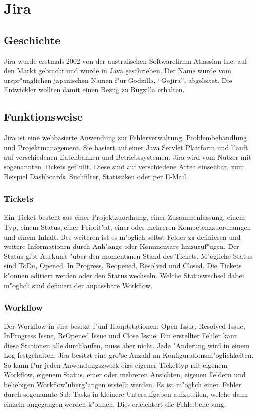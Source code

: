 \section{Jira}
\subsection{Geschichte}
Jira wurde erstmals 2002 von der australischen Softwarefirma Atlassian Inc. auf den Markt gebracht und wurde in Java geschrieben. Der Name wurde vom urspr"unglichen japanischen Namen f"ur Godzilla, ``Gojira'', abgeleitet. Die Entwickler wollten damit einen Bezug zu Bugzilla erhalten.

\subsection{Funktionsweise}
Jira ist eine webbasierte Anwendung zur Fehlerverwaltung, Problembehandlung und Projektmanagement. Sie basiert auf einer Java Servlet Plattform und l"auft auf verschiedenen Datenbanken und Betriebssystemen. Jira wird vom Nutzer mit sogenannten Tickets gef"ullt. Diese sind auf verschiedene Arten einsehbar, zum Beispiel Dashboards, Suchfilter, Statistiken oder per E-Mail.

\subsubsection{Tickets}
Ein Ticket besteht aus einer Projektzuordnung, einer Zusammenfassung, einem Typ, einem Status, einer Priorit"at, einer oder mehreren Kompetenzzuordnungen und einem Inhalt. Des weiteren ist es m"oglich selbst Felder zu definieren und weitere Informationen durch Anh"ange oder Kommentare hinzuzuf"ugen. Der Status gibt Auskunft "uber den momentanen Stand des Tickets. M"ogliche Status sind ToDo, Opened, In Progress, Reopened, Resolved und Closed. Die Tickets k"onnen editiert werden oder den Status wechseln. Welche Statuswechsel dabei m"oglich sind definiert der anpassbare Workflow.

\subsubsection{Workflow}
Der Workflow in Jira besitzt f"unf Hauptstationen: Open Issue, Resolved Issue, InProgress Issue, ReOpened Issue und Close Issue. Ein erstellter Fehler kann diese Stationen alle durchlaufen, muss aber nicht. 
Jede "Anderung wird in einem Log festgehalten. Jira besitzt eine gro"se Anzahl an Konfigurationsm"oglichkeiten. So kann f"ur jeden Anwendungszweck eine eigener Tickettyp mit eigenem Workflow, eigenem Status, einer oder mehreren Ansichten, eigenen Feldern und beliebigen Workflow"uberg"angen erstellt werden.
Es ist m"oglich einen Fehler durch sogenannte Sub-Tasks in kleinere Unteraufgaben aufzuteilen, welche dann einzeln angegangen werden k"onnen. Dies erleichtert die Fehlerbehebung.


